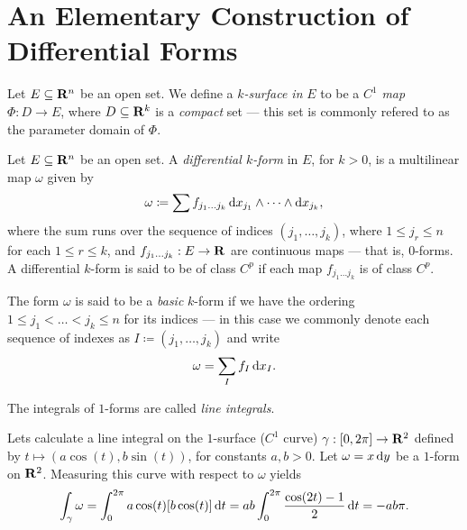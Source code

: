\section{An Elementary Construction of Differential Forms}

\begin{definition}[\(k\)-surface]
\label{def:k-surface-Rn}
Let \(E \subseteq \mathbf{R}^n\) be an open set. We define a \emph{\(k\)-surface in}
\(E\) to be a \(C^1\) \emph{map} \(\Phi: D \to E\), where \(D \subseteq \mathbf{R}^k\)
is a \emph{compact} set --- this set is commonly refered to as the parameter
domain of \(\Phi\).
\end{definition}

\begin{definition}
Let \(E \subseteq \mathbf{R}^n\) be an open set. A \emph{differential \(k\)-form} in
\(E\), for \(k > 0\), is a multilinear map \(\omega\) given by
\[
  \omega \coloneq \sum f_{j_1 \dots j_k}\,
  \mathrm{d} x_{j_1} \wedge \dots \wedge \mathrm{d} x_{j_k},
\]
where the sum runs over the sequence of indices \((j_1, \dots, j_k)\), where \(1
\leq j_r \leq n\) for each \(1 \leq r \leq k\), and \(f_{j_1 \dots j_k}: E \to
\mathbf{R}\) are continuous maps --- that is, \(0\)-forms. A differential \(k\)-form is
said to be of class \(C^p\) if each map \(f_{j_1 \dots j_k}\) is of class
\(C^p\).

The form \(\omega\) is said to be a \emph{basic} \(k\)-form if we have the
ordering \(1 \leq j_1 < \dots < j_k \leq n\) for its indices --- in this case we
commonly denote each sequence of indexes as \(I \coloneq (j_1, \dots, j_k)\) and
write
\[
  \omega = \sum_I f_{I}\, \mathrm{d} x_{I}.
\]
\end{definition}

\begin{definition}
\label{def:line-integral}
The integrals of \(1\)-forms are called \emph{line integrals}.
\end{definition}

\begin{example}
Lets calculate a line integral on the \(1\)-surface (\(C^1\) curve)
\(\gamma: [0, 2 \pi] \to \mathbf{R}^2\) defined by \(t \mapsto (a \cos(t), b \sin(t))\),
for constants \(a, b > 0\). Let \(\omega = x\, \mathrm{d} y\) be a \(1\)-form on
\(\mathbf{R}^2\). Measuring this curve with respect to \(\omega\) yields
\[
  \int_{\gamma} \omega = \int_0^{2\pi} a \cos(t) [b \cos(t)]\, \mathrm{d} t
  = ab \int_0^{2 \pi} \frac{\cos(2t) - 1}{2}\, \mathrm{d} t = - ab \pi.
\]
\end{example}

